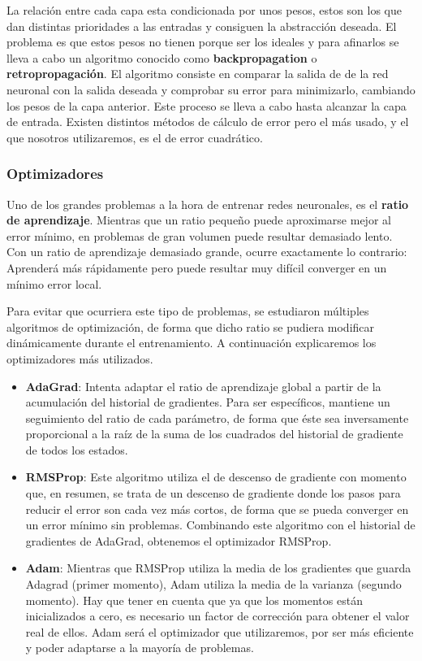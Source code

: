 La relación entre cada capa esta condicionada por unos pesos, estos son los que dan distintas prioridades a las entradas y consiguen la abstracción deseada. El problema es que estos pesos no tienen porque ser los ideales y para afinarlos se lleva a cabo un algoritmo conocido como \textbf {backpropagation} o \textbf {retropropagación}. El algoritmo consiste en comparar la salida de de la red neuronal con la salida deseada y comprobar su error para minimizarlo, cambiando los pesos de la capa anterior. Este proceso se lleva a cabo hasta alcanzar la capa de entrada. Existen distintos métodos de cálculo de error pero el más usado, y el que nosotros utilizaremos, es el de error cuadrático.\\

\subsubsection{Optimizadores}
Uno de los grandes problemas a la hora de entrenar redes neuronales, es el \textbf{ratio de aprendizaje}. Mientras que un ratio pequeño puede aproximarse mejor al error mínimo, en problemas de gran volumen puede resultar demasiado lento. Con un ratio de aprendizaje demasiado grande, ocurre exactamente lo contrario: Aprenderá más rápidamente pero puede resultar muy difícil converger en un mínimo error local.

Para evitar que ocurriera este tipo de problemas, se estudiaron múltiples algoritmos de optimización, de forma que dicho ratio se pudiera modificar dinámicamente durante el entrenamiento. A continuación explicaremos los optimizadores más utilizados.

\begin{itemize}
    \item \textbf{AdaGrad}: Intenta adaptar el ratio de aprendizaje global a partir de la acumulación del historial de gradientes. Para ser específicos, mantiene un seguimiento del ratio de cada parámetro, de forma que éste sea inversamente proporcional a la raíz de la suma de los cuadrados del historial de gradiente de todos los estados. 
    \item \textbf{RMSProp}: Este algoritmo utiliza el de descenso de gradiente con momento que, en resumen, se trata de un descenso de gradiente donde los pasos para reducir el error son cada vez más cortos, de forma que se pueda converger en un error mínimo sin problemas. Combinando este algoritmo con el historial de gradientes de AdaGrad, obtenemos el optimizador RMSProp. 
    \item \textbf{Adam}: Mientras que RMSProp utiliza la media de los gradientes que guarda Adagrad (primer momento), Adam utiliza la media de la varianza (segundo momento). Hay que tener en cuenta que ya que los momentos están inicializados a cero, es necesario un factor de corrección para obtener el valor real de ellos. Adam será el optimizador que utilizaremos, por ser más eficiente y poder adaptarse a la mayoría de problemas. 
\end{itemize}

